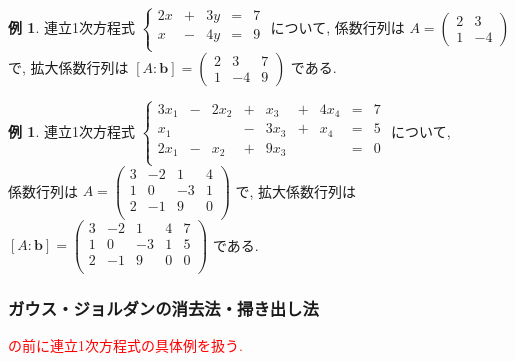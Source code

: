 \documentclass[dvipdfmx,a4paper,11pt]{article} %
\newcommand{\xr}[1]{\textcolor{red}{#1}}
\theoremstyle{definition}
\newtheorem{exa}[thm]{例}
\begin{document}
 \begin{exa}
 連立1次方程式
 $
 \left\{ 
\begin{matrix}
2x&+&3y& = &7 \\
x&-&4y& = &9 \\
\end{matrix}
\right.
 $
 について, 係数行列は
 $A = 
 \begin{pmatrix}
 2 & 3 \\
 1 & -4
 \end{pmatrix}
 $
 で, 拡大係数行列は
 $[A : \bm{b}] = 
  \begin{pmatrix}
 2 & 3  &7\\
 1 & -4 &9
 \end{pmatrix}
 $
 である.
 \end{exa}
 
  \begin{exa}
 連立1次方程式
 $
 \left\{ 
\begin{matrix}
3x_1&-&2x_2& +& x_3 &+& 4x_4 &=& 7 \\
x_1 &  & 	   & -& 3x_3 &+& x_4 &=& 5 \\
2x_1&-& x_2& +& 9x_3 & & 	 &=& 0 \\
\end{matrix}
\right.
 $
 について, \\
 係数行列は
 $A = 
 \begin{pmatrix}
 3 & -2  & 1&4\\
 1 & 0   & -3&1\\
2 & -1  & 9&0\\
 \end{pmatrix}
 $
 で, 拡大係数行列は
 $[A : \bm{b}] = 
 \begin{pmatrix}
 3 & -2  & 1&4 & 7\\
 1 & 0   & -3&1 &5\\
2 & -1  & 9&0 & 0\\
 \end{pmatrix}
 $
 である.
 \end{exa}

\subsubsection{ガウス・ジョルダンの消去法・掃き出し法}

\xr{\cite[定理 2.4.2]{O}の前に連立1次方程式の具体例を扱う. }
\end{document}
